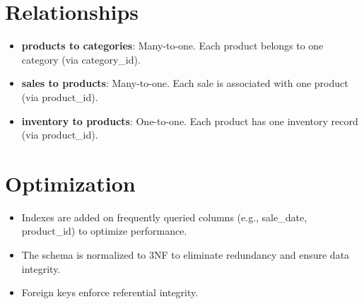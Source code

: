 \documentclass[a4paper,12pt]{article}
\begin{document}
\section{Relationships}
\begin{itemize}
    \item \textbf{products to categories}: Many-to-one. Each product belongs to one category (via category\_id).
    \item \textbf{sales to products}: Many-to-one. Each sale is associated with one product (via product\_id).
    \item \textbf{inventory to products}: One-to-one. Each product has one inventory record (via product\_id).
\end{itemize}

\section{Optimization}
\begin{itemize}
    \item Indexes are added on frequently queried columns (e.g., sale\_date, product\_id) to optimize performance.
    \item The schema is normalized to 3NF to eliminate redundancy and ensure data integrity.
    \item Foreign keys enforce referential integrity.
\end{itemize}
\end{document}
